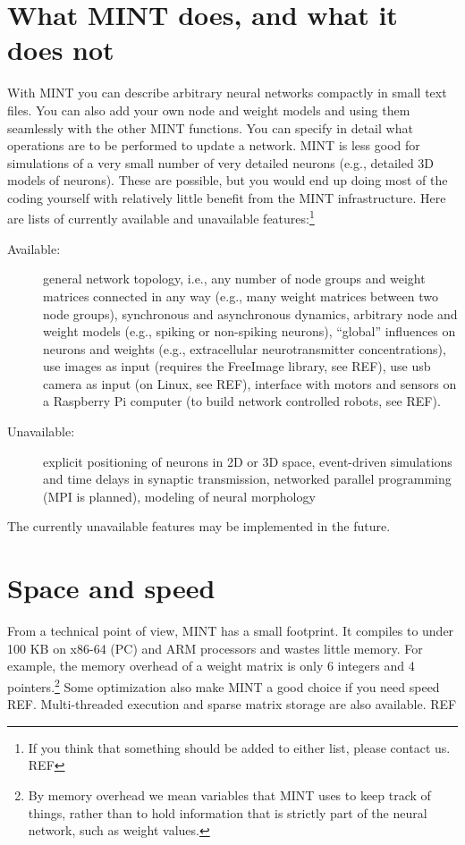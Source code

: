 \documentclass[12pt,letterpaper]{memoir}
\newcommand{\mint}{MINT\xspace}
\begin{document}
\section{What \mint does, and what it does not}
\label{sec:what-mint-does}

With \mint you can describe arbitrary neural networks compactly in
small text files. You can also add your own node and weight models and
using them seamlessly with the other \mint functions. You can specify
in detail what operations are to be performed to update a network.
\mint is less good for simulations of a very small number of very
detailed neurons (e.g., detailed 3D models of neurons). These are
possible, but you would end up doing most of the coding yourself with
relatively little benefit from the \mint infrastructure.  Here are
lists of currently available and unavailable features:\footnote{If you
  think that something should be added to either list, please contact
  us. REF}
\begin{description}
\item[Available:] general network topology, i.e., any number of node
  groups and weight matrices connected in any way (e.g., many weight
  matrices between two node groups), synchronous and asynchronous
  dynamics, arbitrary node and weight models (e.g., spiking or
  non-spiking neurons), ``global'' influences on neurons and weights
  (e.g., extracellular neurotransmitter concentrations), use images as
  input (requires the FreeImage library, see REF), use usb camera as
  input (on Linux, see REF), interface with motors and sensors on a
  Raspberry Pi computer (to build network controlled robots, see REF).
\item[Unavailable:] explicit positioning of neurons in 2D or 3D space,
  event-driven simulations and time delays in synaptic transmission,
  networked parallel programming (MPI is planned), modeling of neural
  morphology
\end{description}
The currently unavailable features may be implemented in the future.

\section{Space and speed}

From a technical point of view, \mint has a small footprint. It
compiles to under 100 KB on x86-64 (PC) and ARM processors and wastes
little memory. For example, the memory overhead of a weight matrix is
only 6 integers and 4 pointers.\footnote{By memory overhead we mean
  variables that \mint uses to keep track of things, rather than to
  hold information that is strictly part of the neural network, such
  as weight values.}  Some optimization also make \mint a good choice
if you need speed REF. Multi-threaded execution and sparse matrix
storage are also available. REF
\end{document}
